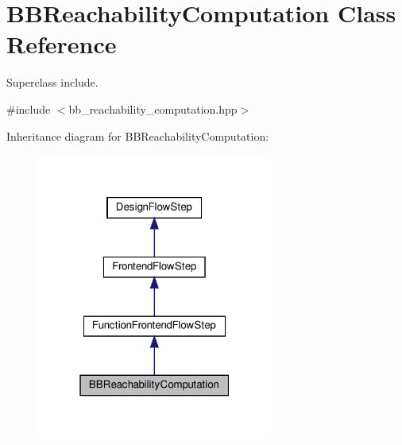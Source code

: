 \hypertarget{classBBReachabilityComputation}{}\section{B\+B\+Reachability\+Computation Class Reference}
\label{classBBReachabilityComputation}


Superclass include.  




{\ttfamily \#include $<$bb\+\_\+reachability\+\_\+computation.\+hpp$>$}



Inheritance diagram for B\+B\+Reachability\+Computation\+:
\nopagebreak
\begin{figure}[H]
\begin{center}
\leavevmode
\includegraphics[width=220pt]{d4/ddc/classBBReachabilityComputation__inherit__graph}
\end{center}
\end{figure}


